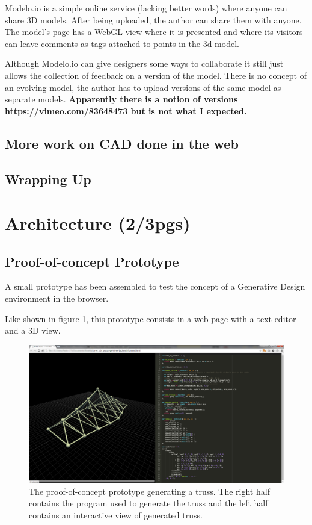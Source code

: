 \documentclass{./llncs2e/llncs}
\begin{document}
	Modelo.io is a simple online service (lacking better words) where anyone can share 3D models. After being uploaded, the author can share them with anyone. The model's page has a WebGL view where it is presented and where its visitors can leave comments as tags attached to points in the 3d model.

	Although Modelo.io can give designers some ways to collaborate it still just allows the collection of feedback on a version of the model. There is no concept of an evolving model, the author has to upload versions of the same model as separate models. \textbf{Apparently there is a notion of versions https://vimeo.com/83648473 but is not what I expected.}

\subsection{More work on CAD done in the web}


\subsection{Wrapping Up}

\section{Architecture (2/3pgs)}

\subsection{Proof-of-concept Prototype}
	A small prototype has been assembled to test the concept of a Generative Design environment in the browser.

	Like shown in figure \ref{fig:proto:3d:p:editor}, this prototype consists in a web page with a text editor and a 3D view.

	\begin{figure}
	  \centering
	  \includegraphics[width=1.0\textwidth]{img/proto_3d_p_editor}
	    \caption{The proof-of-concept prototype generating a truss. The right half contains the program used to generate the truss and the left half contains an interactive view of generated truss.}
	  \label{fig:proto:3d:p:editor}
	\end{figure} 
\end{document}
